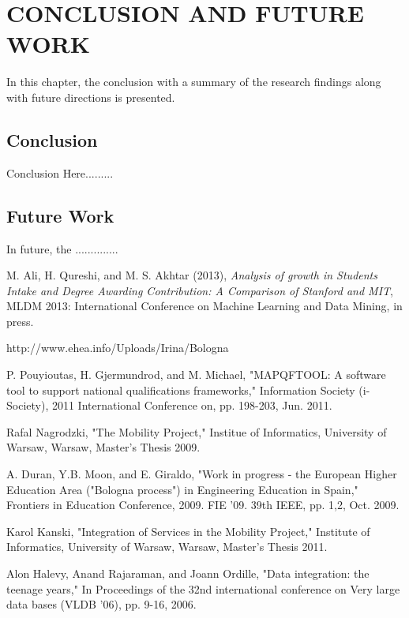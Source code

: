 \documentclass[12pt,a4paper,oneside]{book} %
\begin{document}
\chapter{CONCLUSION AND FUTURE WORK}\label{c-conclusion}

In this chapter, the conclusion with a summary of the research findings along with future directions is presented.

\section{Conclusion}
Conclusion Here.........

\section{Future Work}
In future, the ..............

\begin{thebibliography}{10}

M. Ali, H. Qureshi, and M. S. Akhtar (2013), \emph{Analysis of growth in Students Intake and Degree Awarding Contribution: A Comparison of Stanford and MIT}, MLDM 2013: International Conference on Machine Learning and Data Mining, in press.

http://www.ehea.info/Uploads/Irina/Bologna%

P. Pouyioutas, H. Gjermundrod, and M. Michael, "MAPQFTOOL: A software tool to support national qualifications frameworks," Information Society (i-Society), 2011 International Conference on, pp. 198-203, Jun. 2011.

Rafal Nagrodzki, "The Mobility Project," Institue of Informatics, University of Warsaw, Warsaw, Master's Thesis 2009.

A. Duran, Y.B. Moon, and E. Giraldo, "Work in progress - the European Higher Education Area ("Bologna process") in Engineering Education in Spain," Frontiers in Education Conference, 2009. FIE '09. 39th IEEE, pp. 1,2, Oct. 2009.

Karol Kanski, "Integration of Services in the Mobility Project," Institute of Informatics, University of Warsaw, Warsaw, Master's Thesis 2011.

Alon Halevy, Anand Rajaraman, and Joann Ordille, "Data integration: the teenage years," In Proceedings of the 32nd international conference on Very large data bases (VLDB '06), pp. 9-16, 2006.

\end{thebibliography}
\end{document}
